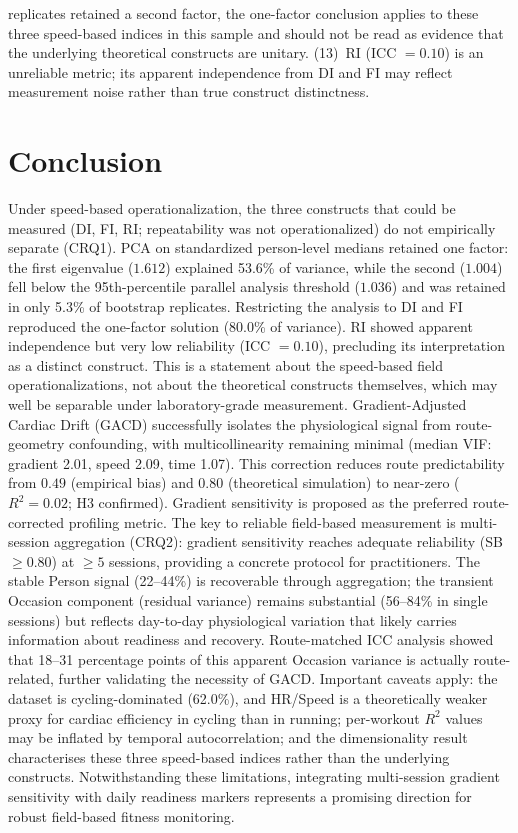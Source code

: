 \documentclass[times, twoside]{zHenriquesLab-StyleBioRxiv}
\begin{document}
replicates retained a second factor, the one-factor conclusion applies to these three speed-based indices in this sample and should not be read as evidence that the underlying theoretical constructs are unitary. (13)~RI (ICC $= 0.10$) is an unreliable metric; its apparent independence from DI and FI may reflect measurement noise rather than true construct distinctness.

\section*{Conclusion}

Under speed-based operationalization, the three constructs that could be measured (DI, FI, RI; repeatability was not operationalized) do not empirically separate (CRQ1). PCA on standardized person-level medians retained one factor: the first eigenvalue ($1.612$) explained 53.6\% of variance, while the second ($1.004$) fell below the 95th-percentile parallel analysis threshold ($1.036$) and was retained in only 5.3\% of bootstrap replicates. Restricting the analysis to DI and FI reproduced the one-factor solution (80.0\% of variance). RI showed apparent independence but very low reliability (ICC $= 0.10$), precluding its interpretation as a distinct construct. This is a statement about the speed-based field operationalizations, not about the theoretical constructs themselves, which may well be separable under laboratory-grade measurement. Gradient-Adjusted Cardiac Drift (GACD) successfully isolates the physiological signal from route-geometry confounding, with multicollinearity remaining minimal (median VIF: gradient 2.01, speed 2.09, time 1.07). This correction reduces route predictability from $0.49$ (empirical bias) and $0.80$ (theoretical simulation) to near-zero ($R^2 = 0.02$; H3 confirmed). Gradient sensitivity is proposed as the preferred route-corrected profiling metric. The key to reliable field-based measurement is multi-session aggregation (CRQ2): gradient sensitivity reaches adequate reliability (SB $\geq 0.80$) at $\geq 5$ sessions, providing a concrete protocol for practitioners. The stable Person signal (22--44\%) is recoverable through aggregation; the transient Occasion component (residual variance) remains substantial (56--84\% in single sessions) but reflects day-to-day physiological variation that likely carries information about readiness and recovery. Route-matched ICC analysis showed that 18--31 percentage points of this apparent Occasion variance is actually route-related, further validating the necessity of GACD. Important caveats apply: the dataset is cycling-dominated (62.0\%), and HR/Speed is a theoretically weaker proxy for cardiac efficiency in cycling than in running; per-workout $R^2$ values may be inflated by temporal autocorrelation; and the dimensionality result characterises these three speed-based indices rather than the underlying constructs. Notwithstanding these limitations, integrating multi-session gradient sensitivity with daily readiness markers represents a promising direction for robust field-based fitness monitoring.
\end{document}
